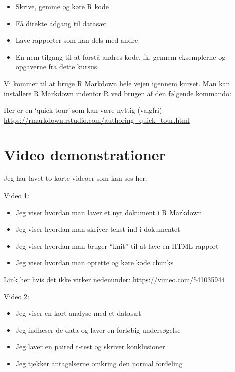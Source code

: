 \documentclass[
]{book}
\providecommand{\tightlist}{%
  \setlength{\itemsep}{0pt}\setlength{\parskip}{0pt}}
\begin{document}
\begin{itemize}
\tightlist
\item
  Skrive, gemme og køre R kode
\item
  Få direkte adgang til datasæt
\item
  Lave rapporter som kan dels med andre
\item
  En nem tilgang til at forstå andres kode, fk. gennem eksemplerne og opgaverne fra dette kursus
\end{itemize}

Vi kommer til at bruge R Markdown hele vejen igennem kurset. Man kan installere R Markdown indenfor R ved brugen af den følgende kommando:

Her er en `quick tour' som kan være nyttig (valgfri)
\url{https://rmarkdown.rstudio.com/authoring_quick_tour.html}

\hypertarget{video-demonstrationer}{%
\section{Video demonstrationer}\label{video-demonstrationer}}

Jeg har lavet to korte videoer som kan ses her.

Video 1:

\begin{itemize}
\tightlist
\item
  Jeg viser hvordan man laver et nyt dokument i R Markdown
\item
  Jeg viser hvordan man skriver tekst ind i dokumentet
\item
  Jeg viser hvordan man bruger ``knit'' til at lave en HTML-rapport
\item
  Jeg viser hvordan man oprette og køre kode chunks
\end{itemize}

Link her hvis det ikke virker nedenunder: \url{https://vimeo.com/541035944}

Video 2:

\begin{itemize}
\tightlist
\item
  Jeg viser en kort analyse med et datasæt
\item
  Jeg indlæser de data og laver en forløbig undersøgelse
\item
  Jeg laver en paired t-test og skriver konklusioner
\item
  Jeg tjekker antagelserne omkring den normal fordeling
\end{itemize}
\end{document}
